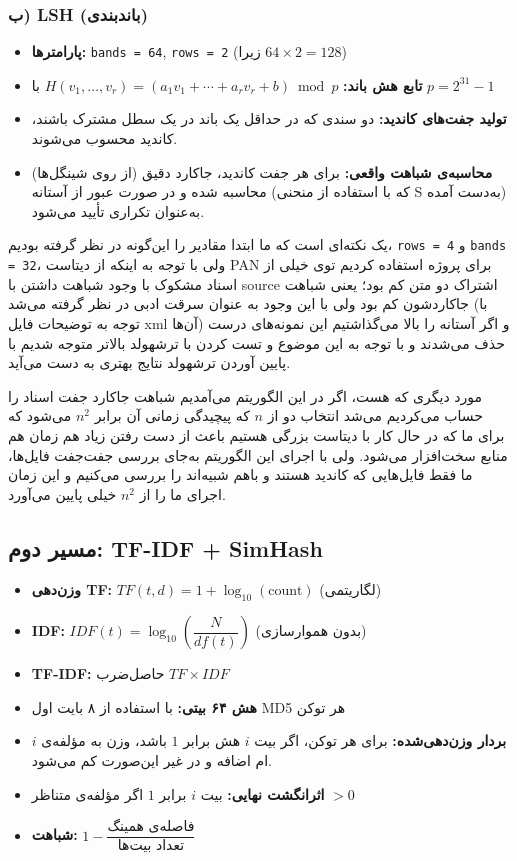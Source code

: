 \documentclass[12pt,a4paper]{article}
\begin{document}
\subsubsection*{ب) LSH (باندبندی)}

\begin{itemize}
    \item \textbf{پارامترها:} \texttt{bands = 64}, \texttt{rows = 2} (زیرا $64 \times 2 = 128$)
    \item \textbf{تابع هش باند:} $H(v_1,\dots,v_r) = (a_1 v_1 + \cdots + a_r v_r + b) \bmod p$ با $p = 2^{31} - 1$
    \item \textbf{تولید جفت‌های کاندید:} دو سندی که در حداقل یک باند در یک سطل مشترک باشند، کاندید محسوب می‌شوند.
    \item \textbf{محاسبه‌ی شباهت واقعی:} برای هر جفت کاندید، جاکارد دقیق (از روی شینگل‌ها) محاسبه شده و در صورت عبور از آستانه (که با استفاده از منحنی S به‌دست آمده) به‌عنوان تکراری تأیید می‌شود.
\end{itemize}

یک نکته‌ای است که ما ابتدا مقادیر را این‌گونه در نظر گرفته بودیم، \texttt{rows = 4} و \texttt{bands = 32}، ولی با توجه به اینکه از دیتاست PAN برای پروژه استفاده کردیم توی خیلی از اسناد مشکوک با وجود شباهت داشتن با source اشتراک دو متن کم بود؛ یعنی شباهت جاکاردشون کم بود ولی با این وجود به عنوان سرقت ادبی در نظر گرفته می‌شد (با توجه به توضیحات فایل xml آن‌ها) و اگر آستانه را بالا می‌گذاشتیم این نمونه‌های درست حذف می‌شدند و با توجه به این موضوع و تست کردن با ترشهولد بالاتر متوجه شدیم با پایین آوردن ترشهولد نتایج بهتری به دست می‌آید.

مورد دیگری که هست، اگر در این الگوریتم می‌آمدیم شباهت جاکارد جفت اسناد را حساب می‌کردیم می‌شد انتخاب دو از $n$ که پیچیدگی زمانی آن برابر $n^2$ می‌شود که برای ما که در حال کار با دیتاست بزرگی هستیم باعث از دست رفتن زیاد هم زمان هم منابع سخت‌افزار می‌شود. ولی با اجرای این الگوریتم به‌جای بررسی جفت‌جفت فایل‌ها، ما فقط فایل‌هایی که کاندید هستند و باهم شبیه‌اند را بررسی می‌کنیم و این زمان اجرای ما را از $n^2$ خیلی پایین می‌آورد.

\subsection{مسیر دوم: TF-IDF + SimHash}

\begin{itemize}
    \item \textbf{وزن‌دهی TF:} $TF(t,d) = 1 + \log_{10}(\text{count})$ (لگاریتمی)
    \item \textbf{IDF:} $IDF(t) = \log_{10}\left(\dfrac{N}{df(t)}\right)$ (بدون هموارسازی)
    \item \textbf{TF-IDF:} حاصل‌ضرب $TF \times IDF$
    \item \textbf{هش ۶۴ بیتی:} با استفاده از ۸ بایت اول MD5 هر توکن
    \item \textbf{بردار وزن‌دهی‌شده:} برای هر توکن، اگر بیت $i$ هش برابر $1$ باشد، وزن به مؤلفه‌ی $i$ام اضافه و در غیر این‌صورت کم می‌شود.
    \item \textbf{اثرانگشت نهایی:} بیت $i$ برابر $1$ اگر مؤلفه‌ی متناظر $> 0$
    \item \textbf{شباهت:} $1 - \dfrac{\text{فاصله‌ی همینگ}}{\text{تعداد بیت‌ها}}$
\end{itemize}
\end{document}

